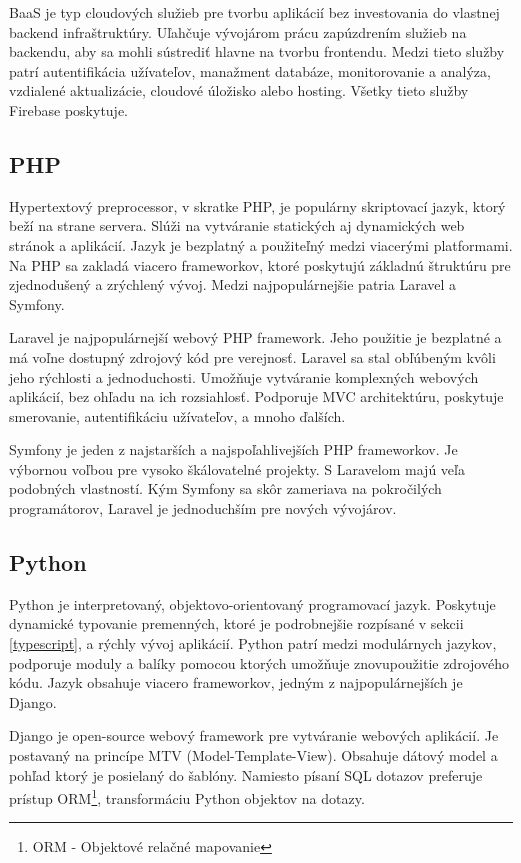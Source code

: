 BaaS je typ cloudových služieb pre tvorbu aplikácií bez investovania do vlastnej backend infraštruktúry. Uľahčuje vývojárom prácu zapúzdrením služieb na backendu, aby sa mohli sústrediť hlavne na tvorbu frontendu. Medzi tieto služby patrí autentifikácia užívateľov, manažment databáze, monitorovanie a analýza, vzdialené aktualizácie, cloudové úložisko alebo hosting. Všetky tieto služby Firebase poskytuje. 

\subsection{PHP}
Hypertextový preprocessor\cite{php}, v skratke PHP, je populárny skriptovací jazyk, ktorý beží na strane servera. Slúži na vytváranie statických aj dynamických web stránok a aplikácií. Jazyk je bezplatný a použiteľný medzi viacerými platformami. Na PHP sa zakladá viacero frameworkov, ktoré poskytujú základnú štruktúru pre zjednodušený a zrýchlený vývoj. Medzi najpopulárnejšie patria Laravel a Symfony.

Laravel je najpopulárnejší webový PHP framework. Jeho použitie je bezplatné a má voľne dostupný zdrojový kód pre verejnosť. Laravel sa stal obľúbeným kvôli jeho rýchlosti a jednoduchosti. Umožňuje vytváranie komplexných webových aplikácií, bez ohľadu na ich rozsiahlosť. Podporuje MVC architektúru, poskytuje smerovanie, autentifikáciu užívateľov, a mnoho ďalších\cite{php}.

Symfony je jeden z najstarších a najspoľahlivejších PHP frameworkov. Je výbornou voľbou pre vysoko škálovatelné projekty. S Laravelom majú veľa podobných vlastností. Kým Symfony sa skôr zameriava na pokročilých programátorov, Laravel je jednoduchším pre nových vývojárov\cite{php}.

\subsection{Python}
Python je interpretovaný, objektovo-orientovaný programovací jazyk\cite{python}. Poskytuje dynamické typovanie premenných, ktoré je podrobnejšie rozpísané v sekcii \ref{typescript}, a rýchly vývoj aplikácií. Python patrí medzi modulárnych jazykov, podporuje moduly a balíky pomocou ktorých umožňuje znovupoužitie zdrojového kódu. Jazyk obsahuje viacero frameworkov, jedným z najpopulárnejších je Django.

Django je open-source webový framework pre vytváranie webových aplikácií. Je postavaný na princípe MTV (Model-Template-View). Obsahuje dátový model a pohľad ktorý je posielaný do šablóny. Namiesto písaní SQL dotazov preferuje prístup ORM\footnote{ORM - Objektové relačné mapovanie}, transformáciu Python objektov na dotazy.

